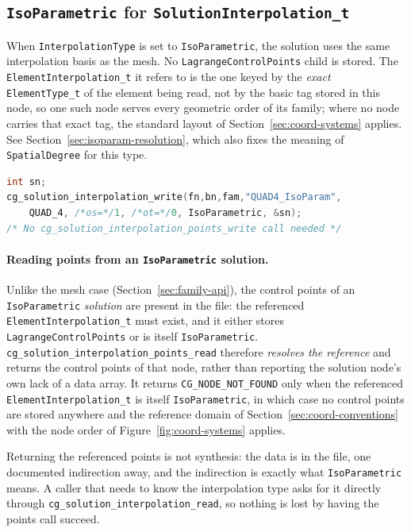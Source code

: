 \documentclass[11pt,letterpaper]{article}
\newif\ifvfourdraft
\newcommand{\vfour}[1]{\ifvfourdraft\textcolor{v4violet}{#1}\else#1\fi}
\begin{document}
\subsection{\texttt{IsoParametric} for \texttt{SolutionInterpolation\_t}}

When \texttt{InterpolationType} is set to \texttt{IsoParametric}, the solution uses the
same interpolation basis as the mesh.  No \texttt{LagrangeControlPoints} child is
stored.  \vfour{The \texttt{ElementInterpolation\_t} it refers to is the one keyed
by the \emph{exact} \texttt{ElementType\_t} of the element being read, not by the
basic tag stored in this node, so one such node serves every geometric order of
its family; where no node carries that exact tag, the standard layout of
Section~\ref{sec:coord-systems} applies.  See
Section~\ref{sec:isoparam-resolution}, which also fixes the meaning of
\texttt{SpatialDegree} for this type.}

\begin{lstlisting}[language=C,basicstyle=\ttfamily\small]
int sn;
cg_solution_interpolation_write(fn,bn,fam,"QUAD4_IsoParam",
    QUAD_4, /*os=*/1, /*ot=*/0, IsoParametric, &sn);
/* No cg_solution_interpolation_points_write call needed */
\end{lstlisting}

\paragraph{Reading points from an \texttt{IsoParametric} solution.}
Unlike the mesh case (Section~\ref{sec:family-api}), the control points of an
\texttt{IsoParametric} \emph{solution} are present in the file: the referenced
\texttt{ElementInterpolation\_t} must exist, and it either stores
\texttt{LagrangeControlPoints} or is itself \texttt{IsoParametric}.
\texttt{cg\_solution\_interpolation\_points\_read} therefore \emph{resolves the reference} and
returns the control points of that node, rather than reporting the solution node's own lack of
a data array.  It returns \texttt{CG\_NODE\_NOT\_FOUND} only when the referenced
\texttt{ElementInterpolation\_t} is itself \texttt{IsoParametric}, in which case no control
points are stored anywhere and the reference domain of
Section~\ref{sec:coord-conventions} with the node order of
Figure~\ref{fig:coord-systems} applies.

Returning the referenced points is not synthesis: the data is in the file, one documented
indirection away, and the indirection is exactly what \texttt{IsoParametric} means.  A caller
that needs to know the interpolation type asks for it directly through
\texttt{cg\_solution\_interpolation\_read}, so nothing is lost by having the points call
succeed.
\end{document}
